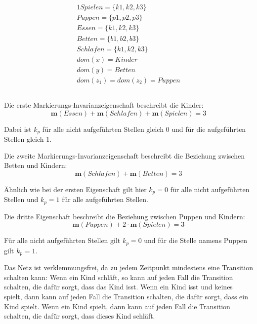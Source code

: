 \documentclass[10pt,a4paper,oneside,ngerman,numbers=noenddot]{scrartcl}
\begin{document}
\subsection{}
\begin{alignat*}{1}
	Spielen = \{k1, k2, k3\} \\
	Puppen = \{p1, p2, p3\} \\
	Essen = \{k1, k2, k3\} \\
	Betten = \{b1, b2, b3\} \\
	Schlafen = \{k1, k2, k3\} \\
	dom(x) = Kinder \\
	dom(y) = Betten \\
	dom(z_1) = dom(z_2) = Puppen
\end{alignat*}

\subsection{}
Die erste Markierungs-Invarianzeigenschaft beschreibt die Kinder:
\[
	\textbf{m}(Essen) + \textbf{m}(Schlafen) + \textbf{m}(Spielen) = 3
\]

Dabei ist \(k_p\) für alle nicht aufgeführten Stellen gleich 0 und für die aufgeführten Stellen gleich 1.

Die zweite Markierungs-Invarianzeigenschaft beschreibt die Beziehung zwischen Betten und Kindern:
\[
	\textbf{m}(Schlafen) + \textbf{m}(Betten) = 3
\]

Ähnlich wie bei der ersten Eigenschaft gilt hier \(k_p=0\) für alle nicht aufgeführten Stellen und \(k_p=1\) für alle aufgeführten Stellen.

Die dritte Eigenschaft beschreibt die Beziehung zwischen Puppen und Kindern:
\[
	\textbf{m}(Puppen) + 2 \cdot \textbf{m}(Spielen) = 3
\]

Für alle nicht aufgeführten Stellen gilt \(k_p=0\) und für die Stelle namens Puppen gilt \(k_p=1\).

Das Netz ist verklemmungsfrei, da zu jedem Zeitpunkt mindestens eine Transition schalten kann: Wenn ein Kind schläft, so kann auf jeden Fall die Transition schalten, die dafür sorgt, dass das Kind isst. Wenn ein Kind isst und keines spielt, dann kann auf jeden Fall die Transition schalten, die dafür sorgt, dass ein Kind spielt. Wenn ein Kind spielt, dann kann auf jeden Fall die Transition schalten, die dafür sorgt, dass dieses Kind schläft.
\end{document}
